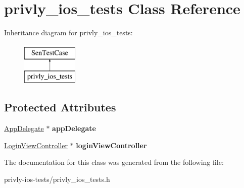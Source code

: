 \hypertarget{interfaceprivly__ios__tests}{\section{privly\-\_\-ios\-\_\-tests Class Reference}
\label{interfaceprivly__ios__tests}
}
Inheritance diagram for privly\-\_\-ios\-\_\-tests\-:\begin{figure}[H]
\begin{center}
\leavevmode
\includegraphics[height=2.000000cm]{interfaceprivly__ios__tests}
\end{center}
\end{figure}
\subsection*{Protected Attributes}
\begin{DoxyCompactItemize}
\item 
\hypertarget{interfaceprivly__ios__tests_af5c0c0653632470cbfe1b2a2df0b615c}{\hyperlink{interface_app_delegate}{App\-Delegate} $\ast$ {\bfseries app\-Delegate}}\label{interfaceprivly__ios__tests_af5c0c0653632470cbfe1b2a2df0b615c}

\item 
\hypertarget{interfaceprivly__ios__tests_af341988e0fa810104a5d968183663212}{\hyperlink{interface_login_view_controller}{Login\-View\-Controller} $\ast$ {\bfseries login\-View\-Controller}}\label{interfaceprivly__ios__tests_af341988e0fa810104a5d968183663212}

\end{DoxyCompactItemize}


The documentation for this class was generated from the following file\-:\begin{DoxyCompactItemize}
\item 
privly-\/ios-\/tests/privly\-\_\-ios\-\_\-tests.\-h\end{DoxyCompactItemize}
